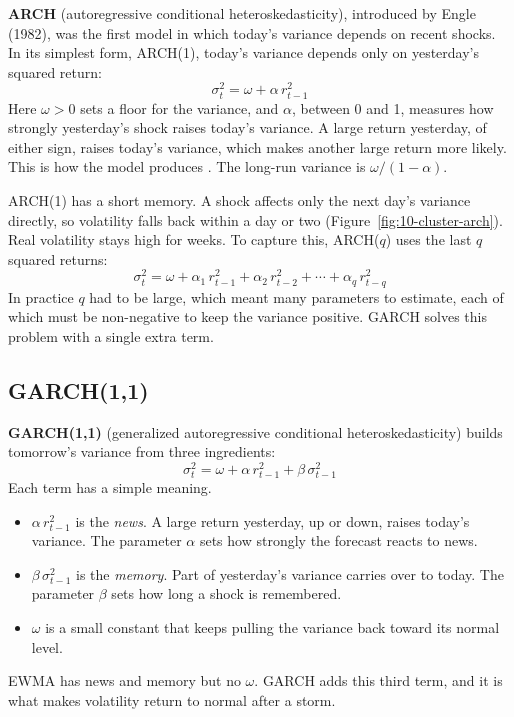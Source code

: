 \textbf{ARCH} (autoregressive conditional heteroskedasticity), introduced by Engle (1982), was the first model in which today's variance depends on recent shocks. In its simplest form, ARCH(1), today's variance depends only on yesterday's squared return:
\begin{equation}
  \sigma^2_t = \omega + \alpha\,r^2_{t-1}
  \label{eq:10-arch}
\end{equation}
Here $\omega > 0$ sets a floor for the variance, and $\alpha$, between 0 and 1, measures how strongly yesterday's shock raises today's variance. A large return yesterday, of either sign, raises today's variance, which makes another large return more likely. This is how the model produces . The long-run variance is $\omega / (1 - \alpha)$.

ARCH(1) has a short memory. A shock affects only the next day's variance directly, so volatility falls back within a day or two (Figure~\ref{fig:10-cluster-arch}). Real volatility stays high for weeks. To capture this, ARCH($q$) uses the last $q$ squared returns:
\begin{equation}
  \sigma^2_t = \omega + \alpha_1\,r^2_{t-1} + \alpha_2\,r^2_{t-2} + \cdots + \alpha_q\,r^2_{t-q}
  \label{eq:10-archq}
\end{equation}
In practice $q$ had to be large, which meant many parameters to estimate, each of which must be non-negative to keep the variance positive. GARCH solves this problem with a single extra term.


\subsection{GARCH(1,1)}
\label{sec:10-garch}

\textbf{GARCH(1,1)} (generalized autoregressive conditional heteroskedasticity) builds tomorrow's variance from three ingredients:
\begin{equation}
  \sigma^2_t = \omega + \alpha\,r^2_{t-1} + \beta\,\sigma^2_{t-1}
  \label{eq:10-garch}
\end{equation}
Each term has a simple meaning.
\begin{itemize}
  \item $\alpha\,r^2_{t-1}$ is the \emph{news}. A large return yesterday, up or down, raises today's variance. The parameter $\alpha$ sets how strongly the forecast reacts to news.
  \item $\beta\,\sigma^2_{t-1}$ is the \emph{memory}. Part of yesterday's variance carries over to today. The parameter $\beta$ sets how long a shock is remembered.
  \item $\omega$ is a small constant that keeps pulling the variance back toward its normal level.
\end{itemize}
EWMA has news and memory but no $\omega$. GARCH adds this third term, and it is what makes volatility return to normal after a storm.

